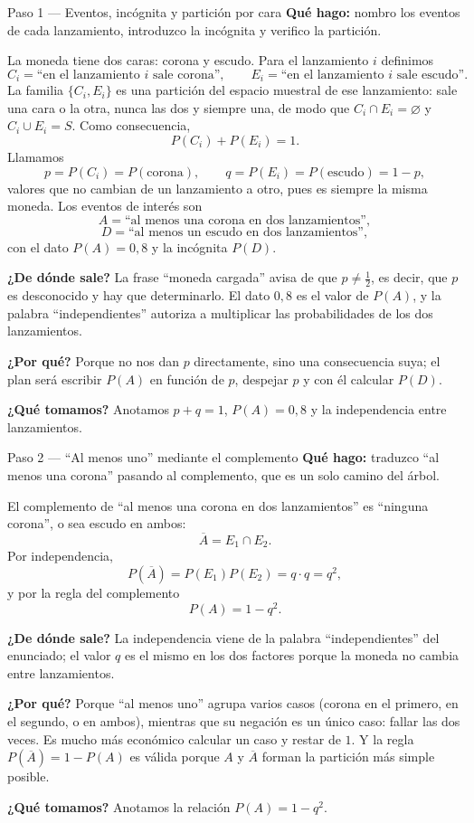 \documentclass[11pt]{article}
\begin{document}
\begin{paso}{Paso 1 --- Eventos, incógnita y partición por cara}
\textbf{Qué hago:} nombro los eventos de cada lanzamiento, introduzco la incógnita y verifico la partición.

La moneda tiene dos caras: corona y escudo. Para el lanzamiento $i$ definimos
\[
C_i=\text{``en el lanzamiento $i$ sale corona''},
\qquad
E_i=\text{``en el lanzamiento $i$ sale escudo''}.
\]
La familia $\{C_i,E_i\}$ es una partición del espacio muestral de ese lanzamiento: sale una cara o la otra, nunca las dos y siempre una, de modo que $C_i\cap E_i=\varnothing$ y $C_i\cup E_i=S$. Como consecuencia,
\[
P(C_i)+P(E_i)=1 .
\]
Llamamos
\[
p=P(C_i)=P(\text{corona}),
\qquad
q=P(E_i)=P(\text{escudo})=1-p ,
\]
valores que no cambian de un lanzamiento a otro, pues es siempre la misma moneda. Los eventos de interés son
\[
A=\text{``al menos una corona en dos lanzamientos''},
\]
\[
D=\text{``al menos un escudo en dos lanzamientos''},
\]
con el dato $P(A)=0{,}8$ y la incógnita $P(D)$.

\textbf{¿De dónde sale?} La frase ``moneda cargada'' avisa de que $p\neq\tfrac12$, es decir, que $p$ es desconocido y hay que determinarlo. El dato $0{,}8$ es el valor de $P(A)$, y la palabra ``independientes'' autoriza a multiplicar las probabilidades de los dos lanzamientos.

\textbf{¿Por qué?} Porque no nos dan $p$ directamente, sino una consecuencia suya; el plan será escribir $P(A)$ en función de $p$, despejar $p$ y con él calcular $P(D)$.

\textbf{¿Qué tomamos?} Anotamos $p+q=1$, $P(A)=0{,}8$ y la independencia entre lanzamientos.
\end{paso}

\begin{paso}{Paso 2 --- ``Al menos uno'' mediante el complemento}
\textbf{Qué hago:} traduzco ``al menos una corona'' pasando al complemento, que es un solo camino del árbol.

El complemento de ``al menos una corona en dos lanzamientos'' es ``ninguna corona'', o sea escudo en ambos:
\[
\overline{A}=E_1\cap E_2 .
\]
Por independencia,
\[
P(\overline{A})=P(E_1)P(E_2)=q\cdot q=q^{2},
\]
y por la regla del complemento
\[
P(A)=1-q^{2}.
\]

\textbf{¿De dónde sale?} La independencia viene de la palabra ``independientes'' del enunciado; el valor $q$ es el mismo en los dos factores porque la moneda no cambia entre lanzamientos.

\textbf{¿Por qué?} Porque ``al menos uno'' agrupa varios casos (corona en el primero, en el segundo, o en ambos), mientras que su negación es un único caso: fallar las dos veces. Es mucho más económico calcular un caso y restar de $1$. Y la regla $P(\overline{A})=1-P(A)$ es válida porque $A$ y $\overline{A}$ forman la partición más simple posible.

\textbf{¿Qué tomamos?} Anotamos la relación $P(A)=1-q^{2}$.
\end{paso}
\end{document}
